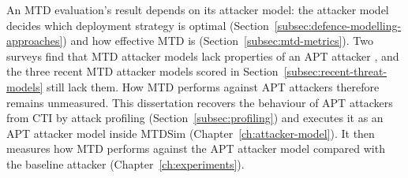 \documentclass{cshonours}
\begin{document}
An MTD evaluation's result depends on its attacker model: the attacker model
decides which deployment strategy is optimal
(Section~\ref{subsec:defence-modelling-approaches}) and how effective MTD is
(Section~\ref{subsec:mtd-metrics}). Two surveys find that MTD attacker
models lack properties of an APT attacker \citep{cho2020, jalowski2026},
and the three recent MTD attacker models scored in
Section~\ref{subsec:recent-threat-models} still lack them. How MTD performs
against APT attackers therefore remains unmeasured. This dissertation
recovers the behaviour of APT attackers from CTI by attack profiling
(Section~\ref{subsec:profiling}) and executes it as an APT attacker model
inside MTDSim (Chapter~\ref{ch:attacker-model}). It then measures how MTD
performs against the APT attacker model compared with the baseline attacker
(Chapter~\ref{ch:experiments}).
\end{document}
